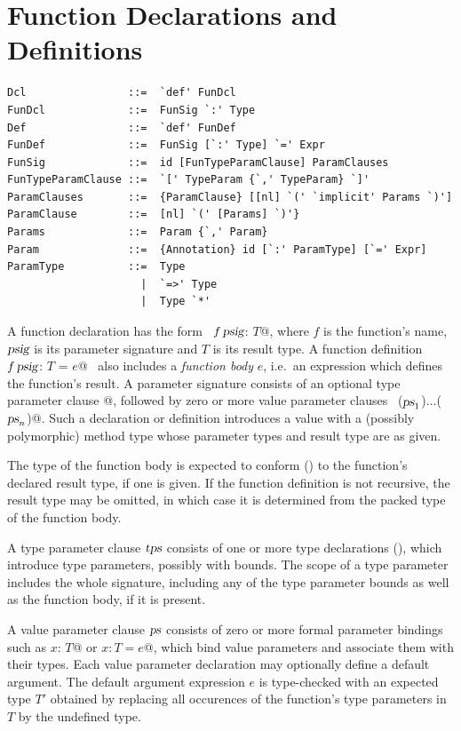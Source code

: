 \section{Function Declarations and Definitions}
\label{sec:funsigs}

\syntax\begin{lstlisting} 
Dcl                ::=  `def' FunDcl
FunDcl             ::=  FunSig `:' Type
Def                ::=  `def' FunDef
FunDef             ::=  FunSig [`:' Type] `=' Expr 
FunSig             ::=  id [FunTypeParamClause] ParamClauses
FunTypeParamClause ::=  `[' TypeParam {`,' TypeParam} `]' 
ParamClauses       ::=  {ParamClause} [[nl] `(' `implicit' Params `)']
ParamClause        ::=  [nl] `(' [Params] `)'} 
Params             ::=  Param {`,' Param}
Param              ::=  {Annotation} id [`:' ParamType] [`=' Expr]
ParamType          ::=  Type 
                     |  `=>' Type 
                     |  Type `*'
\end{lstlisting}

A function declaration has the form ~\lstinline@def $f\,\mbox{\sl psig}$: $T$@, where
$f$ is the function's name, $\mbox{\sl psig}$ is its parameter
signature and $T$ is its result type. A function definition
~\lstinline@def $f\,\mbox{\sl psig}$: $T$ = $e$@~ also includes a {\em function body} $e$,
i.e.\ an expression which defines the function's result.  A parameter
signature consists of an optional type parameter clause \lstinline@[$\tps\,$]@,
followed by zero or more value parameter clauses
~\lstinline@($\mbox{\sl ps}_1$)$\ldots$($\mbox{\sl ps}_n$)@.  Such a declaration or definition
introduces a value with a (possibly polymorphic) method type whose
parameter types and result type are as given.

The type of the function body is expected to conform () 
to the function's declared
result type, if one is given. If the function definition is not
recursive, the result type may be omitted, in which case it is
determined from the packed type of the function body.

A type parameter clause $\mbox{\sl tps}$ consists of one or more type
declarations (), which introduce type parameters,
possibly with bounds.  The scope of a type parameter includes
the whole signature, including any of the type parameter bounds as
well as the function body, if it is present.  

A value parameter clause $\mbox{\sl ps}$ consists of zero or more formal
parameter bindings such as \lstinline@$x$: $T$@ or \lstinline@$x: T = e$@, which bind value
parameters and associate them with their types. Each value parameter
declaration may optionally define a default argument. The default argument
expression $e$ is type-checked with an expected type $T'$ obtained
by replacing all occurences of the function's type parameters in $T$ by
the undefined type.

